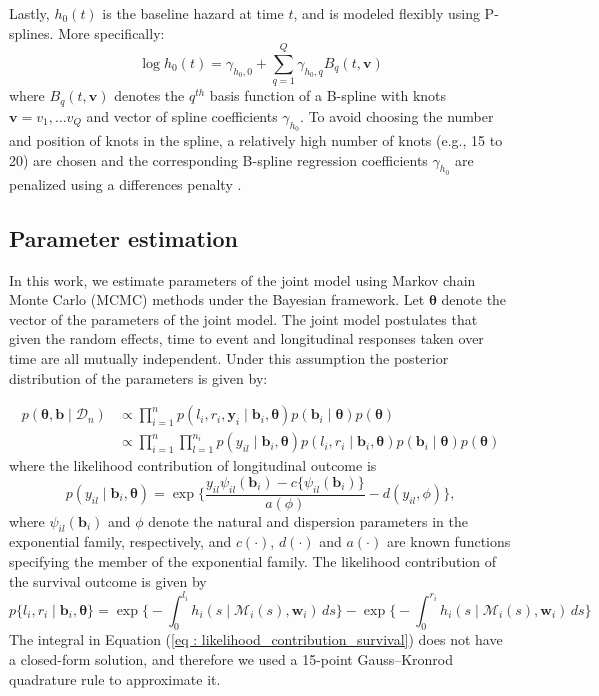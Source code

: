Lastly, $h_0(t)$ is the baseline hazard at time $t$, and is modeled flexibly using P-splines. More specifically:
\begin{equation*}
\log{h_0(t)} = \gamma_{h_0,0} + \sum_{q=1}^Q \gamma_{h_0,q} B_q(t, \boldsymbol{v})
\end{equation*}
where $B_q(t, \boldsymbol{v})$ denotes the $q^{th}$ basis function of a B-spline with knots $\boldsymbol{v} = v_1, \ldots v_Q$ and vector of spline coefficients $\gamma_{h_0}$. To avoid choosing the number and position of knots in the spline, a relatively high number of knots (e.g., 15 to 20) are chosen and the corresponding B-spline regression coefficients $\gamma_{h_0}$ are penalized using a differences penalty \citep{eilers1996flexible}.

\subsection{Parameter estimation}
In this work, we estimate parameters of the joint model using Markov chain Monte Carlo (MCMC) methods under the Bayesian framework. Let $\boldsymbol{\theta}$ denote the vector of the parameters of the joint model. The joint model postulates that given the random effects, time to event and longitudinal responses taken over time are all mutually independent. Under this assumption the posterior distribution of the parameters is given by:

\begin{align*}
p(\boldsymbol{\theta}, \boldsymbol{b} \mid \mathcal{D}_n) & \propto \prod_{i=1}^n p(l_i, r_i, \boldsymbol{y}_i \mid \boldsymbol{b}_i, \boldsymbol{\theta}) p(\boldsymbol{b}_i \mid \boldsymbol{\theta}) p(\boldsymbol{\theta})\\
& \propto \prod_{i=1}^n  \prod_{l=1}^{n_i} p(y_{il} \mid \boldsymbol{b}_i, \boldsymbol{\theta}) p(l_i, r_i \mid \boldsymbol{b}_i, \boldsymbol{\theta})  p(\boldsymbol{b}_i \mid \boldsymbol{\theta}) p(\boldsymbol{\theta})
\end{align*}
where the likelihood contribution of longitudinal outcome is
\begin{equation*}
p(y_{il}\mid \boldsymbol{b}_i,\boldsymbol{\theta})=
\exp\Bigg\{\frac{y_{il}\psi_{il}(\boldsymbol{b}_i)-c\{\psi_{il}(\boldsymbol{b}_i)\}}{a(\phi)} -d( y_{il},\phi)         \Bigg\},
\end{equation*}
where $\psi_{il}(\boldsymbol{b}_i)$ and $\phi$ denote the natural and dispersion parameters in the exponential family, respectively, and $c(\cdot)$, $d(\cdot)$ and $a(\cdot)$ are known functions specifying the member of the exponential family. The likelihood contribution of the survival outcome is given by
\begin{equation}
\label{eq : likelihood_contribution_survival}
p\{l_i,r_i\mid \boldsymbol{b}_i,\boldsymbol{\theta}\} = \exp\Big\{-\int_0^{l_i} h_i(s \mid \mathcal{M}_i(s), \boldsymbol{w}_i)\,ds\Big\} - \exp\Big\{-\int_0^{r_i}h_i(s \mid \mathcal{M}_i(s), \boldsymbol{w}_i)\,ds\Big\}
\end{equation}
The integral in Equation (\ref{eq : likelihood_contribution_survival}) does not have a closed-form solution, and therefore we used a 15-point Gauss–Kronrod quadrature rule to approximate it.\\

